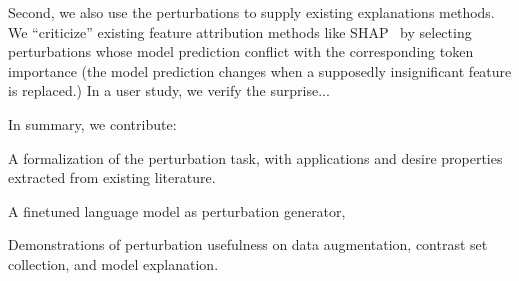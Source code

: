 Second, we also use the perturbations to supply existing explanations methods.
We ``criticize'' existing feature attribution methods like SHAP~\cite{NIPS2017_7062} by selecting perturbations whose model prediction conflict with the corresponding token importance (\eg the model prediction changes when a supposedly insignificant feature is replaced.)
In a user study, we verify the surprise...

In summary, we contribute: 
\begin{compactenum}
\item A formalization of the perturbation task, with applications and desire properties extracted from existing literature.
\item A finetuned language model as perturbation generator, 
\item Demonstrations of perturbation usefulness on data augmentation, contrast set collection, and model explanation. 
\end{compactenum}









